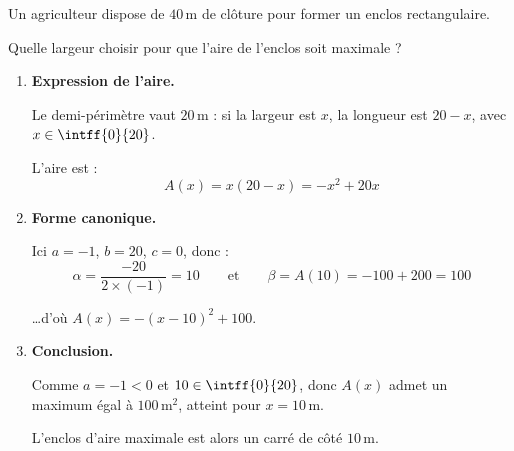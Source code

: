 \begin{ex}
	Un agriculteur dispose de $40\,\text{m}$ de clôture pour former un enclos rectangulaire.

	Quelle largeur choisir pour que l'aire de l'enclos soit maximale ?

	\bigskip

	\begin{minipage}[c]{0.36\linewidth}
		\centering
	\end{minipage}\hfill
	\begin{minipage}[c]{0.60\linewidth}
	\end{minipage}

	\medskip
	\begin{enumerate}
		\item \textbf{Expression de l'aire.}

		      Le demi-périmètre vaut $20\,\text{m}$ : si la largeur est $x$, la longueur est $20 - x$, avec $x \in \intff{0}{20}$.

		      L'aire est :
		      \[
			      A(x) = x(20 - x) = -x^2 + 20x
		      \]

		\item \textbf{Forme canonique.}

		      Ici $a = -1$, $b = 20$, $c = 0$, donc :
		      \[
			      \alpha = \frac{-20}{2 \times (-1)} = 10
			      \qquad \text{et} \qquad
			      \beta = A(10) = -100 + 200 = 100
		      \]

		      \ldots d'où $A(x) = -(x - 10)^2 + 100$.

		\item \textbf{Conclusion.}

		      Comme $a = -1 < 0$ et $10 \in \intff{0}{20}$, donc $A(x)$ admet un maximum égal à $100\,\text{m}^2$, atteint pour $x = 10\,\text{m}$.

		      L'enclos d'aire maximale est alors un carré de côté $10\,\text{m}$.
	\end{enumerate}
\end{ex}

